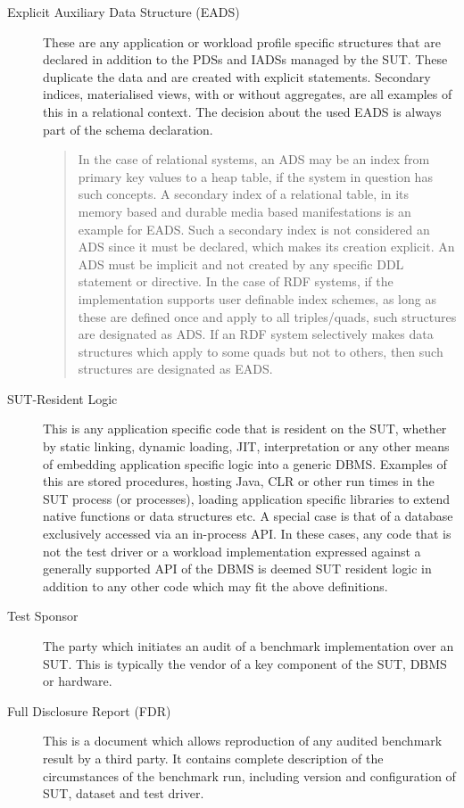 \begin{description}
    \item[Explicit Auxiliary Data Structure (EADS)] These are any application or workload profile specific structures that are declared in addition to the PDSs and IADSs managed by the SUT. These duplicate the data and are created with explicit statements. Secondary indices, materialised views, with or without aggregates, are all examples of this in a relational context. 
    The decision about the used EADS is always part of the schema declaration.
    \begin{quote}
        In the case of relational systems, an ADS may be an index from primary key values to a heap table, if the system in question has such concepts. 
        A secondary index of a relational table, in its memory based and durable media based manifestations is an example for EADS. Such a secondary index is not considered an ADS since it must be declared, which makes its creation explicit. An ADS must be implicit and not created by any specific DDL statement or directive. In the case of RDF systems, if the implementation supports user definable index schemes, as long as these are defined once and apply to all triples/quads, such structures are designated as ADS. If an RDF system selectively makes data structures which apply to some quads but not to others, then such structures are designated as EADS.
    \end{quote}

    \item[SUT-Resident Logic] This is any application specific code that is resident on the SUT, whether by static linking, dynamic loading, JIT, interpretation or any other means of embedding application specific logic into a generic DBMS. Examples of this are stored procedures, hosting Java, CLR or other run times in the SUT process (or processes), loading application specific libraries to extend native functions or data structures etc. A special case is that of a database exclusively accessed via an in-process API. In these cases, any code that is not the test driver or a workload implementation expressed against a generally supported API of the DBMS is deemed SUT resident logic in addition to any other code which may fit the above definitions.

    \item[Test Sponsor] The party which initiates an audit of a benchmark implementation over an SUT. This is typically the vendor of a key component of the SUT, \eg DBMS or hardware.

    \item[Full Disclosure Report (FDR)] This is a document which allows reproduction of any audited benchmark result by a third party. It contains complete description of the circumstances of the benchmark run, including version and configuration of SUT, dataset and test driver.
    
\end{description}
